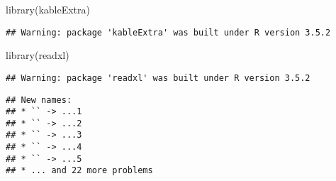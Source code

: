 \documentclass[
]{article}
\newenvironment{Shaded}{\begin{snugshade}}{\end{snugshade}}
\newcommand{\AttributeTok}[1]{\textcolor[rgb]{0.77,0.63,0.00}{#1}}
\newcommand{\ConstantTok}[1]{\textcolor[rgb]{0.00,0.00,0.00}{#1}}
\newcommand{\FunctionTok}[1]{\textcolor[rgb]{0.00,0.00,0.00}{#1}}
\newcommand{\NormalTok}[1]{#1}
\newcommand{\OtherTok}[1]{\textcolor[rgb]{0.56,0.35,0.01}{#1}}
\newcommand{\SpecialCharTok}[1]{\textcolor[rgb]{0.00,0.00,0.00}{#1}}
\newcommand{\StringTok}[1]{\textcolor[rgb]{0.31,0.60,0.02}{#1}}
\begin{document}
\begin{Shaded}
\begin{Highlighting}[]
\FunctionTok{library}\NormalTok{(}\StringTok{\textquotesingle{}kableExtra\textquotesingle{}}\NormalTok{)}
\end{Highlighting}
\end{Shaded}

\begin{verbatim}
## Warning: package 'kableExtra' was built under R version 3.5.2
\end{verbatim}

\begin{Shaded}
\begin{Highlighting}[]
\FunctionTok{library}\NormalTok{(}\StringTok{\textquotesingle{}readxl\textquotesingle{}}\NormalTok{)}
\end{Highlighting}
\end{Shaded}

\begin{verbatim}
## Warning: package 'readxl' was built under R version 3.5.2
\end{verbatim}

\begin{Shaded}
\end{Shaded}

\begin{verbatim}
## New names:
## * `` -> ...1
## * `` -> ...2
## * `` -> ...3
## * `` -> ...4
## * `` -> ...5
## * ... and 22 more problems
\end{verbatim}
\end{document}
